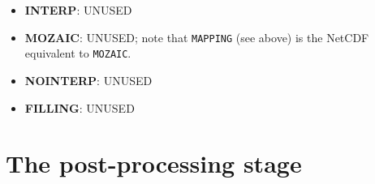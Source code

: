 \begin{itemize}





  {\bf Support of vector fields with the SCRIPR remappings}

  Vector mapping is NOT supported and will not be supported by
  OASIS3-MCT. For proper treatment of vector fields, the component
  model has to send the 3 components of the vector projected in a
  Cartesian coordinate system.

\item {\bf INTERP}: UNUSED

\item {\bf MOZAIC}: UNUSED; note that {\tt MAPPING} (see above) is the
  NetCDF equivalent to {\tt MOZAIC}.

\item {\bf NOINTERP}: UNUSED

\item {\bf FILLING}: UNUSED

\end{itemize}

\section{The post-processing stage}
\label{subsec_cooking}

